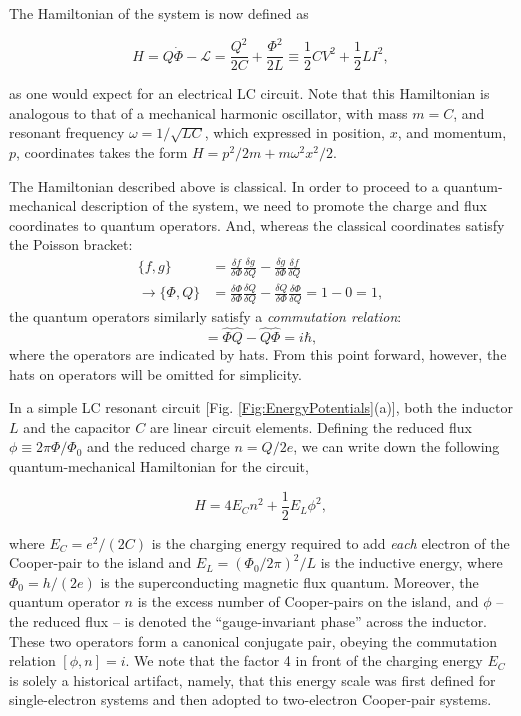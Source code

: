 \documentclass[aip,apr,twocolumn,showpacs,superscriptaddress,groupedaddress,nofootinbib,reprint]{revtex4-1}  %
\begin{document}
The Hamiltonian of the system is now defined as

\begin{equation}
H = Q\dot{\Phi} - \mathcal{L} = \frac{Q^2}{2C} + \frac{\Phi^2}{2L} \equiv
    \frac{1}{2} C V^2 + \frac{1}{2} L I^2,
\label{Eq:HamiltonianLC}
\end{equation}

\noindent as one would expect for an electrical LC circuit. Note that this Hamiltonian is analogous to that of a mechanical harmonic oscillator, with mass $m = C$, and resonant frequency $\omega = 1/\sqrt{LC}$, which expressed in position, $x$, and momentum, $p$, coordinates takes the form $H = p^2/2m + m\omega^2 x^2/2$.

The Hamiltonian described above is classical. In order to proceed to a quantum-mechanical description of the system, we need to promote the charge and flux coordinates to quantum operators. And, whereas the classical coordinates satisfy the Poisson bracket:
\begin{align}
\{f,g\}
    &= \frac{\delta f}{\delta \Phi} \frac{\delta g}{\delta Q} - \frac{\delta g}{\delta \Phi} \frac{\delta f}{\delta Q} \\
 \rightarrow \{\Phi,Q\}  &= \frac{\delta \Phi}{\delta \Phi} \frac{\delta Q}{\delta Q} - \frac{\delta Q}{\delta \Phi} \frac{\delta \Phi}{\delta Q} = 1-0 = 1,
\end{align}
%
the quantum operators similarly satisfy a \textit{commutation relation}:
%
\begin{equation}
[\hat{\Phi},\hat{Q}] = \hat{\Phi}\hat{Q} - \hat{Q}\hat{\Phi} = i\hbar,
\label{Eq:CommutationRelationPhiq}
\end{equation}
%
\noindent where the operators are indicated by hats. From this point forward, however, the hats on operators will be omitted for simplicity.

In a simple LC resonant circuit [Fig. \ref{Fig:EnergyPotentials}(a)], both the inductor $L$ and the capacitor $C$ are linear circuit elements. Defining the reduced flux $\phi \equiv 2 \pi \Phi / \Phi_0$ and the reduced charge $n=Q/2e$, we can write down the following quantum-mechanical Hamiltonian for the circuit,

\begin{equation}
H = 4E_C n^2 + \frac{1}{2}E_L \phi^2,
\label{Eq:Hqho}
\end{equation}

\noindent where $E_C = e^2/(2C)$ is the charging energy required to add {\em each} electron of the Cooper-pair to the island and $E_L = (\Phi_0/2\pi)^2/L$ is the inductive energy, where $\Phi_0 = h/(2e)$ is the superconducting magnetic flux quantum. Moreover, the quantum operator $n$ is the excess number of Cooper-pairs on the island, and $\phi$ -- the reduced flux -- is denoted the ``gauge-invariant phase'' across the inductor. These two operators form a canonical conjugate pair, obeying the commutation relation $[\phi,n] = i$. We note that the factor 4 in front of the charging energy $E_C$ is solely a historical artifact, namely, that this energy scale was first defined for single-electron systems and then adopted to two-electron Cooper-pair systems.
\end{document}
